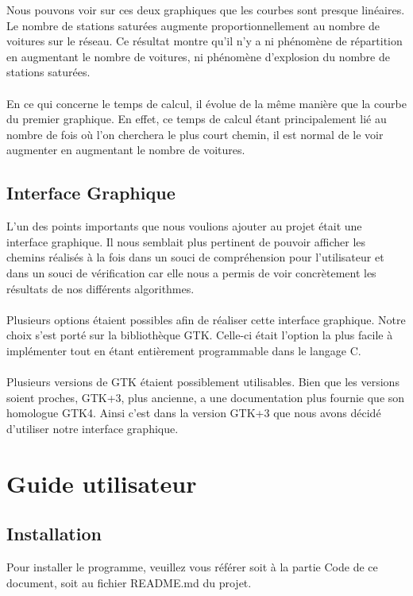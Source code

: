 \documentclass[12pt,titlepage]{report}
\begin{document}
Nous pouvons voir sur ces deux graphiques que les courbes sont presque linéaires. Le nombre de stations saturées augmente proportionnellement au nombre de voitures sur le réseau. Ce résultat montre qu’il n’y a ni phénomène de répartition en augmentant le nombre de voitures, ni phénomène d’explosion du nombre de stations saturées.
\\ \\
En ce qui concerne le temps de calcul, il évolue de la même manière que la courbe du premier graphique. En effet, ce temps de calcul étant principalement lié au nombre de fois où l’on cherchera le plus court chemin, il est normal de le voir augmenter en augmentant le nombre de voitures.

\section{Interface Graphique}

L’un des points importants que nous voulions ajouter au projet était une interface graphique. Il nous semblait plus pertinent de pouvoir afficher les chemins réalisés à la fois dans un souci de compréhension pour l’utilisateur et dans un souci de vérification car elle nous a permis de voir concrètement les résultats de nos différents algorithmes. 
\\ \\
Plusieurs options étaient possibles afin de réaliser cette interface graphique. Notre choix s’est porté sur la bibliothèque GTK. Celle-ci était l’option la plus facile à implémenter tout en étant entièrement programmable dans le langage C.
\\ \\
Plusieurs versions de GTK étaient possiblement utilisables. Bien que les versions soient proches, GTK+3, plus ancienne, a une documentation plus fournie que son homologue GTK4.
Ainsi c’est dans la version GTK+3 que nous avons décidé d'utiliser notre interface graphique.



\newpage
\chapter{Guide utilisateur}

\section{Installation}
Pour installer le programme, veuillez vous référer soit à la partie Code de ce document, soit au fichier README.md du projet.
\end{document}
